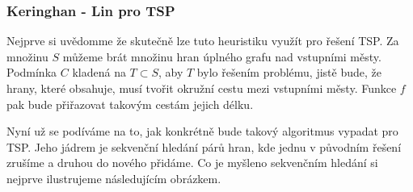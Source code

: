 \documentclass[
  biblatex,
  figures=false,
  glossaries,
  index
]{kidiplom}
\begin{document}
\subsubsection{Keringhan - Lin pro TSP}
Nejprve si uvědomme že skutečně lze tuto heuristiku využít pro řešení TSP. Za množinu $S$ můžeme brát množinu hran úplného grafu nad vstupními městy. Podmínka $C$ kladená na $T \subset S$, aby $T$ bylo řešením problému, jistě bude, že hrany, které obsahuje, musí tvořit okružní cestu mezi vstupními městy. Funkce $f$ pak bude přiřazovat takovým cestám jejich délku.

Nyní už se podíváme na to, jak konkrétně bude takový algoritmus vypadat pro TSP. Jeho jádrem je sekvenční hledání párů hran, kde jednu v původním řešení zrušíme a druhou do nového přidáme. Co je myšleno sekvenčním hledání si nejprve ilustrujeme následujícím obrázkem.
\end{document}
